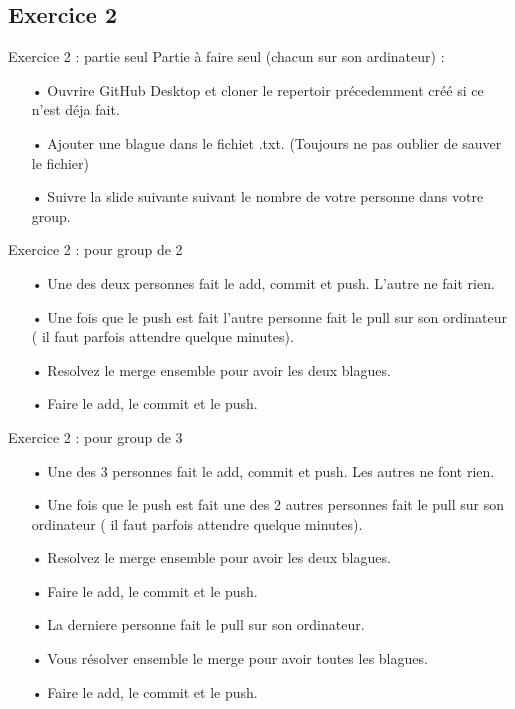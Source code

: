 \documentclass{beamer}
\begin{document}
\subsection{Exercice 2}
\begin{frame}{Exercice 2 : partie seul}
    Partie à faire seul (chacun sur son ardinateur) :
    \begin{itemize}
    \item[•] Ouvrire GitHub Desktop et cloner le repertoir précedemment créé si ce n'est déja fait.
    \item[•] Ajouter une blague dans le fichiet .txt. (Toujours ne pas oublier de sauver le fichier)
    \item[•] Suivre la slide suivante suivant le nombre de votre personne dans votre group.
    \end{itemize}
\end{frame}

\begin{frame}{Exercice 2 : pour group de 2}
    \begin{itemize}
    \item[•] Une des deux personnes fait le add, commit et push. L'autre ne fait rien.
    \item[•] Une fois que le push est fait l'autre personne fait le pull sur son ordinateur ( il faut parfois attendre quelque minutes).
    \item[•] Resolvez le merge ensemble pour avoir les deux blagues.
    \item[•] Faire le add, le commit et le push.
    \end{itemize}
\end{frame}

\begin{frame}{Exercice 2 : pour group de 3}
    \begin{itemize}
    \item[•] Une des 3 personnes fait le add, commit et push. Les autres ne font rien.
    \item[•] Une fois que le push est fait une des 2 autres personnes fait le pull sur son ordinateur ( il faut parfois attendre quelque minutes).
    \item[•] Resolvez le merge ensemble pour avoir les deux blagues.
    \item[•] Faire le add, le commit et le push.
    \item[•] La derniere personne fait le pull sur son ordinateur.
    \item[•] Vous résolver ensemble le merge pour avoir toutes les blagues.
    \item[•] Faire le add, le commit et le push.
    \end{itemize}
\end{frame}
\end{document}
